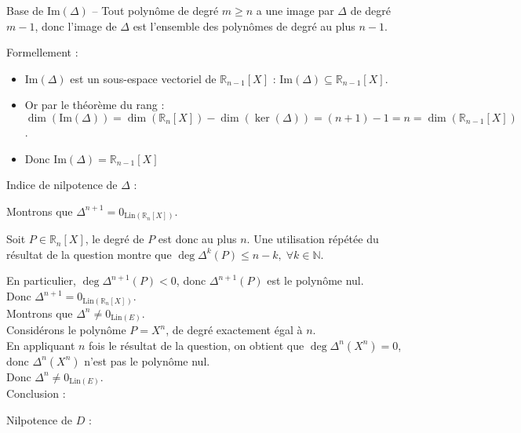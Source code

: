 \documentclass[10pt,a4paper]{article}
\begin{document}
Base de \(\mathrm{Im}(\Delta)\) -- Tout polynôme de degré \(m \geq n\) a une image par \(\Delta\)
de degré \(m-1\), donc l'image de \(\Delta\) est l'ensemble des polynômes de degré au plus \(n-1\).

Formellement :
\begin{itemize}
\item \(\mathrm{Im}(\Delta)\) est un sous-espace vectoriel de \(\mathbb{R}_{n-1}[X]\) : \(\mathrm{Im}(\Delta) \subseteq \mathbb{R}_{n-1}[X]\).
\item Or par le théorème du rang : \(\dim(\mathrm{Im}(\Delta)) = \dim(\mathbb{R}_n[X]) - \dim(\ker(\Delta)) = (n+1) - 1 = n = \dim(\mathbb{R}_{n-1}[X])\).
\item Donc \(\mathrm{Im}(\Delta) = \mathbb{R}_{n-1}[X]\)
\end{itemize}



\q Indice de nilpotence de \(\Delta\) :

Montrons que \(\Delta^{n+1} = 0_{\mathrm{Lin}(\mathbb{R}_n[X])}\).

Soit \(P \in \mathbb{R}_n[X]\), le degré de \(P\) est donc au plus \(n\). Une utilisation répétée du
résultat de la question montre que \(\deg \Delta^k(P) \leq n - k, \; \forall k \in \mathbb{N}\).

En particulier, \(\deg \Delta^{n+1}(P) < 0\), donc  \(\Delta^{n+1}(P)\) est le polynôme nul. \\
Donc \(\Delta^{n+1} = 0_{\mathrm{Lin}(\mathbb{R}_n[X])}\).\\
Montrons que \(\Delta^n \neq 0_{\mathrm{Lin}(E)}\).\\
Considérons le polynôme \(P = X^n\), de degré exactement égal à \(n\).\\
En appliquant \(n\) fois le résultat de la question, on obtient que \(\deg\Delta^{n}(X^n) = 0\), donc  \(\Delta^{n}(X^n)\) n'est pas le polynôme nul.\\
Donc \(\Delta^n \neq 0_{\mathrm{Lin}(E)}\).\\
Conclusion : 


\q Nilpotence de \(D\) :
\end{document}

